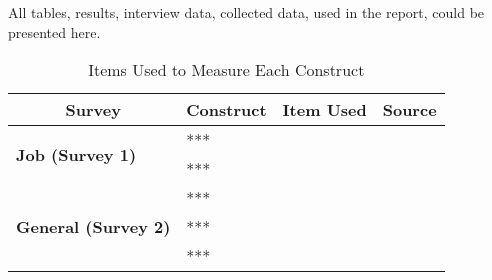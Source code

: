 {}

All tables, results, interview data, collected data, used in the report, could be presented here. 

\begin{table}[h!]
\centering
\begin{tabular}{|p{3.5cm}|p{2cm}|p{4.5cm}|p{2cm}|}
\hline
\multicolumn{1}{|c|}{\textbf{Survey}} & \multicolumn{1}{c|}{\textbf{Construct}} & \multicolumn{1}{c|}{\textbf{Item Used}} & \multicolumn{1}{c|}{\textbf{Source}} \\ \hline
\multirow{6}{*}{\textbf{Job (Survey 1)}}      & \multirow{2}{*}{***} &  & \multirow{2}{*}{} \\ \cline{3-3}
                                              &                      &  &                   \\ \cline{2-4} 
                                              & \multirow{4}{*}{***} &  & \multirow{4}{*}{} \\ \cline{3-3}
                                              &                      &  &                   \\ \cline{3-3}
                                              &                      &  &                   \\ \cline{3-3}
                                              &                      &  &                   \\ \hline
\multirow{10}{*}{\textbf{General (Survey 2)}} & \multirow{3}{*}{***} &  & \multirow{3}{*}{} \\ \cline{3-3}
                                              &                      &  &                   \\ \cline{3-3}
                                              &                      &  &                   \\ \cline{2-4} 
                                              & \multirow{3}{*}{***}    &  & \multirow{3}{*}{} \\ \cline{3-3}
                                              &                      &  &                   \\ \cline{3-3}
                                              &                      &  &                   \\ \cline{2-4} 
                                              & \multirow{4}{*}{***}    &  & \multirow{4}{*}{} \\ \cline{3-3}
                                              &                      &  &                   \\ \cline{3-3}
                                              &                      &  &                   \\ \cline{3-3}
                                              &                      &  &                   \\ \hline
\end{tabular}
\caption{Items Used to Measure Each Construct}
\label{tab:appendixtable}
\end{table}

\newpage